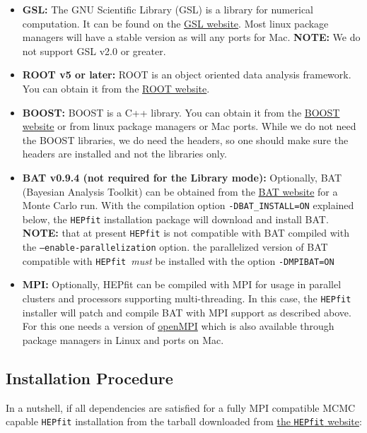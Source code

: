 \documentclass[preprint,3p,12pt]{elsarticle}
\newcommand{\HEPfit}{\texttt{HEPfit}\xspace}
\begin{document}
\begin{itemize}
\item {\bf GSL:}  The GNU Scientific Library (GSL) is a library for numerical computation. It can be found on the \href{http://www.gnu.org/software/gsl/}{GSL website}. Most linux package managers will have a stable version as will any ports for Mac. {\bf NOTE:} We do not support GSL v2.0 or greater. 

\item {\bf ROOT v5 or later:}  ROOT is an object oriented data analysis framework. You can obtain it from the \href{http://root.cern.ch/}{ROOT website}.

\item {\bf BOOST:}  BOOST is a C++ library. You can obtain it from the \href{http://www.boost.org}{BOOST website} or from linux package managers or Mac ports. While we do not need the BOOST libraries, we do need the headers, so one should make sure the headers are installed and not the libraries only. 

\item {\bf BAT v0.9.4 (not required for the Library mode):} Optionally, BAT (Bayesian Analysis Toolkit) can be obtained from 
    the \href{https://www.mppmu.mpg.de/bat/}{BAT website} for a Monte Carlo run. With the compilation 
    option \texttt{-DBAT\_INSTALL=ON} explained below, the \HEPfit installation package 
    will download and install BAT. {\bf NOTE:} that at present \HEPfit is not
    compatible with BAT compiled with the \texttt{--enable-parallelization} option. the parallelized version of BAT compatible with \HEPfit\ {\em must} be installed with the option \texttt{-DMPIBAT=ON}

\item {\bf MPI:}    Optionally, HEPfit can be compiled with MPI for usage in parallel 
    clusters and processors supporting multi-threading. In this case,
    the \HEPfit installer will patch and compile BAT with MPI support as described above. For this one needs a version of \href{https://www.open-mpi.org/}{openMPI} which is also available through package managers in Linux and ports on Mac.
\end{itemize}

\subsection{Installation Procedure}

In a nutshell, if all dependencies are satisfied for a fully MPI compatible MCMC capable \HEPfit installation from the tarball downloaded from \href{http://hepfit.roma1.infn.it/}{the \HEPfit website}:
\end{document}
